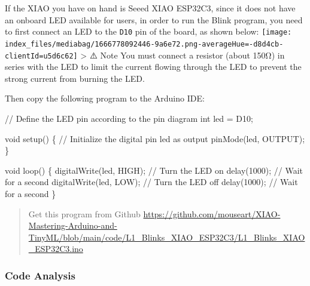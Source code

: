\documentclass[
  letterpaper,
  DIV=11,
  numbers=noendperiod]{scrreprt}
\newenvironment{Shaded}{\begin{snugshade}}{\end{snugshade}}
\newcommand{\CommentTok}[1]{\textcolor[rgb]{0.37,0.37,0.37}{#1}}
\newcommand{\DataTypeTok}[1]{\textcolor[rgb]{0.68,0.00,0.00}{#1}}
\newcommand{\DecValTok}[1]{\textcolor[rgb]{0.68,0.00,0.00}{#1}}
\newcommand{\NormalTok}[1]{\textcolor[rgb]{0.00,0.23,0.31}{#1}}
\newcommand{\OperatorTok}[1]{\textcolor[rgb]{0.37,0.37,0.37}{#1}}
\begin{document}
If the XIAO you have on hand is Seeed XIAO ESP32C3, since it does not
have an onboard LED available for users, in order to run the Blink
program, you need to first connect an LED to the \texttt{D10} pin of the
board, as shown below:
\texttt{[image: index\_files/mediabag/1666778092446-9a6e72.png-averageHue=-d8d4cb-clientId=u5d6c62]}
\textgreater{} ⚠️ Note You must connect a resistor (about 150Ω) in
series with the LED to limit the current flowing through the LED to
prevent the strong current from burning the LED.

Then copy the following program to the Arduino IDE:

\begin{Shaded}
\begin{Highlighting}[]
\CommentTok{// Define the LED pin according to the pin diagram}
\DataTypeTok{int}\NormalTok{ led }\OperatorTok{=}\NormalTok{ D10}\OperatorTok{;}

\DataTypeTok{void}\NormalTok{ setup}\OperatorTok{()} \OperatorTok{\{}
    \CommentTok{// Initialize the digital pin \textquotesingle{}led\textquotesingle{} as output}
\NormalTok{    pinMode}\OperatorTok{(}\NormalTok{led}\OperatorTok{,}\NormalTok{ OUTPUT}\OperatorTok{);}
\OperatorTok{\}}

\DataTypeTok{void}\NormalTok{ loop}\OperatorTok{()} \OperatorTok{\{}
\NormalTok{    digitalWrite}\OperatorTok{(}\NormalTok{led}\OperatorTok{,}\NormalTok{ HIGH}\OperatorTok{);}   \CommentTok{// Turn the LED on}
\NormalTok{    delay}\OperatorTok{(}\DecValTok{1000}\OperatorTok{);}               \CommentTok{// Wait for a second}
\NormalTok{    digitalWrite}\OperatorTok{(}\NormalTok{led}\OperatorTok{,}\NormalTok{ LOW}\OperatorTok{);}    \CommentTok{// Turn the LED off}
\NormalTok{    delay}\OperatorTok{(}\DecValTok{1000}\OperatorTok{);}               \CommentTok{// Wait for a second}
\OperatorTok{\}}
\end{Highlighting}
\end{Shaded}

\begin{quote}
Get this program from Github
\url{https://github.com/mouseart/XIAO-Mastering-Arduino-and-TinyML/blob/main/code/L1_Blinks_XIAO_ESP32C3/L1_Blinks_XIAO_ESP32C3.ino}
\end{quote}

\hypertarget{code-analysis-1}{%
\subsubsection*{Code Analysis}\label{code-analysis-1}}
\end{document}
